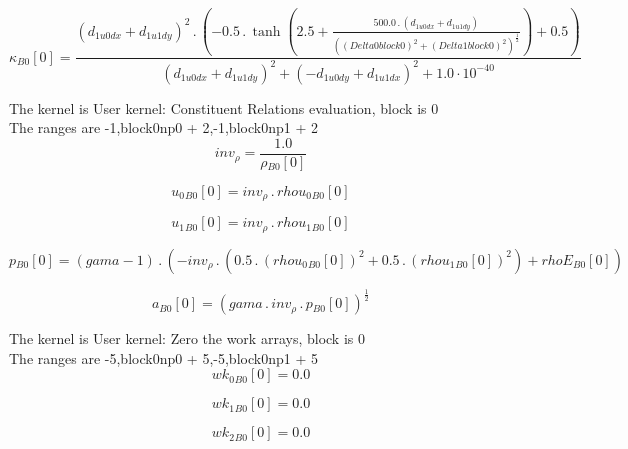 \documentclass{article}
\begin{document}
\begin{dmath}{\kappa{_{B0}}}[{0}] = \frac{\left(d_{1 u0 dx} + d_{1 u1 dy} \right)^{2} \,.\, \left(- 0.5 \,.\, \tanh{\left (2.5 + \frac{500.0 \,.\, \left(d_{1 u0 dx} + d_{1 u1 dy}\right)}{\left(\left(Delta0block0 \right)^{2} + \left(Delta1block0 
\right)^{2} \right)^{\frac{1}{2}}} \right )} + 0.5\right)}{\left(d_{1 u0 dx} + d_{1 u1 dy} \right)^{2} + \left(- d_{1 u0 dy} + d_{1 u1 dx} \right)^{2} + 1.0 \cdot 10^{-40}}\end{dmath}

\noindent The kernel is User kernel: Constituent Relations evaluation, block is 0\\\noindent The ranges are -1,block0np0 + 2,-1,block0np1 + 2\\\begin{dmath}inv_{\rho} = \frac{1.0}{{\rho{_{B0}}}[{0}]}\end{dmath}

\begin{dmath}{u_{0}{_{B0}}}[{0}] = inv_{\rho} \,.\, {rhou_{0}{_{B0}}}[{0}]\end{dmath}

\begin{dmath}{u_{1}{_{B0}}}[{0}] = inv_{\rho} \,.\, {rhou_{1}{_{B0}}}[{0}]\end{dmath}

\begin{dmath}{p{_{B0}}}[{0}] = \left(gama - 1\right) \,.\, \left(- inv_{\rho} \,.\, \left(0.5 \,.\, \left({rhou_{0}{_{B0}}}[{0}] \right)^{2} + 0.5 \,.\, \left({rhou_{1}{_{B0}}}[{0}] \right)^{2}\right) + {rhoE{_{B0}}}[{0}]\right)\end{dmath}

\begin{dmath}{a{_{B0}}}[{0}] = \left(gama \,.\, inv_{\rho} \,.\, {p{_{B0}}}[{0}] \right)^{\frac{1}{2}}\end{dmath}

\noindent The kernel is User kernel: Zero the work arrays, block is 0\\\noindent The ranges are -5,block0np0 + 5,-5,block0np1 + 5\\\begin{dmath}{wk_{0}{_{B0}}}[{0}] = 0.0\end{dmath}

\begin{dmath}{wk_{1}{_{B0}}}[{0}] = 0.0\end{dmath}

\begin{dmath}{wk_{2}{_{B0}}}[{0}] = 0.0\end{dmath}
\end{document}

